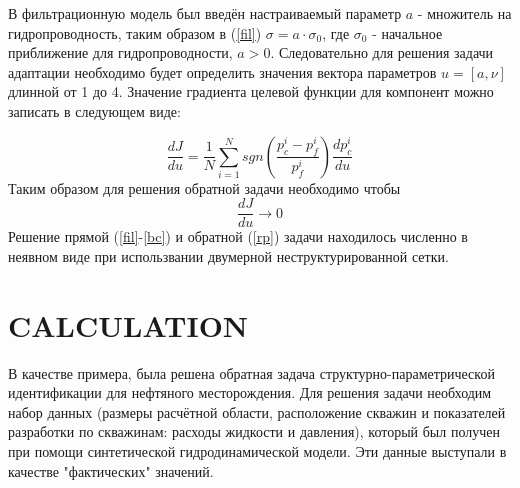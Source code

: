 \documentclass{article}
\begin{document}
В фильтрационную модель был введён настраиваемый параметр $a$ - множитель на гидропроводность, таким образом в (\ref{fil}) $\sigma = a\cdot\sigma_0$, где $\sigma_0$ - начальное приближение для гидропроводности, $a>0$. Следовательно для решения задачи адаптации необходимо будет определить значения вектора параметров $u = [a, \nu]$ длинной от 1 до 4. Значение градиента целевой функции для компонент можно записать в следующем виде:

\begin{equation}
\frac{dJ}{du} = \frac{1}{N}\sum_{i=1}^N sgn\left(\frac{p_c^i-p_f^i}{p_f^i}\right)\frac{dp_c^i}{du}
\end{equation}
Таким образом для решения обратной задачи необходимо чтобы
\begin{equation} \label{rp}
	 \frac{dJ}{du} \rightarrow 0
\end{equation}
Решение прямой (\ref{fil}-\ref{bc}) и обратной (\ref{rp}) задачи находилось численно в неявном виде 
при использвании двумерной неструктурированной сетки.

\section{CALCULATION}
В качестве примера, была решена обратная задача структурно-параметрической идентификации для нефтяного месторождения. Для решения задачи необходим набор данных (размеры расчётной области, расположение скважин и показателей разработки по скважинам: расходы жидкости и давления), который был получен при помощи синтетической гидродинамической модели. Эти данные выступали в качестве "фактических" значений. 
\end{document}
